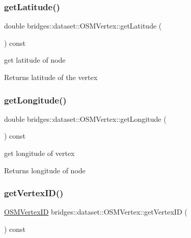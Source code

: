 \subsubsection{\texorpdfstring{getLatitude()}{getLatitude()}}
{\footnotesize\ttfamily double bridges\+::dataset\+::\+O\+S\+M\+Vertex\+::get\+Latitude (\begin{DoxyParamCaption}{ }\end{DoxyParamCaption}) const\hspace{0.3cm}{\ttfamily [inline]}}

get latitude of node

\begin{DoxyReturn}{Returns}
latitude of the vertex 
\end{DoxyReturn}
\mbox{\label{classbridges_1_1dataset_1_1_o_s_m_vertex_a98e17875d886a63ed73a6f77cc26686d}} 
\subsubsection{\texorpdfstring{getLongitude()}{getLongitude()}}
{\footnotesize\ttfamily double bridges\+::dataset\+::\+O\+S\+M\+Vertex\+::get\+Longitude (\begin{DoxyParamCaption}{ }\end{DoxyParamCaption}) const\hspace{0.3cm}{\ttfamily [inline]}}

get longitude of vertex

\begin{DoxyReturn}{Returns}
longitude of node 
\end{DoxyReturn}
\mbox{\label{classbridges_1_1dataset_1_1_o_s_m_vertex_a92f3b28a05940e4c45a0cf933c3fab2c}} 
\subsubsection{\texorpdfstring{getVertexID()}{getVertexID()}}
{\footnotesize\ttfamily \mbox{\hyperlink{classbridges_1_1dataset_1_1_o_s_m_vertex_ad166f13b0aefbdc05a273546f2a3bb96}{O\+S\+M\+Vertex\+ID}} bridges\+::dataset\+::\+O\+S\+M\+Vertex\+::get\+Vertex\+ID (\begin{DoxyParamCaption}{ }\end{DoxyParamCaption}) const\hspace{0.3cm}{\ttfamily [inline]}}

